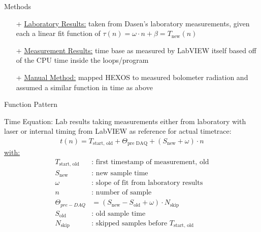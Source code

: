 \documentclass{beamer}
\newcommand{\ix}[1]{_\text{#1}}
\begin{document}
    \begin{frame}{Methods}
        \begin{block}{}
            \begin{itemize}
                \item[+]{%
                    \underline{Laboratory Results:} %
                    taken from Dasen's laboratory %
                    measurements, given each a linear fit function of %
                    $\tau(n)=\omega\cdot n+\beta=T\ix{new}(n)$}%
                \item[+]{%
                    \underline{Measurement Results:} %
                    time base as measured by LabVIEW %
                    itself based off of the CPU time inside the loops/program}
                \item[+]{%
                    \underline{Manual Method:} %
                    mapped HEXOS to measured bolometer %
                    radiation and assumed a similar function in time %
                    as above}
            \end{itemize}
        \end{block}%
    \end{frame}

    \begin{frame}{Function Pattern}
        \begin{block}{Time Equation: Lab results}
            taking measurements either from laboratory with laser or %
            internal timing from LabVIEW as reference for actual timetrace:%
            \begin{align}%
                t\left(n\right)=%
                    T\ix{start, old}+\Theta\ix{pre DAQ}+%
                    \left(S\ix{new}+\omega\right)\cdot n\nonumber%
            \end{align}%
            \quad\quad\underline{with:}%
            \begin{align}%
                T\ix{start, old}&\text{: first timestamp of measurement, old}%
                    \nonumber\\%
                S\ix{new}&\text{: new sample time}\nonumber\\%
                \omega&\text{: slope of fit from laboratory results}%
                    \nonumber\\%
                n&\text{: number of sample}\nonumber\\%
                \Theta_{pre-DAQ}&=%
                    \left(S\ix{new}-S\ix{old}+\omega\right)%
                    \cdot N\ix{skip}\nonumber\\%
                S\ix{old}&\text{: old sample time}\nonumber\\%
                N\ix{skip}&\text{: skipped samples before }T\ix{start, old}%
                    \nonumber%
            \end{align}%
        \end{block}%
    \end{frame}%
\end{document}
